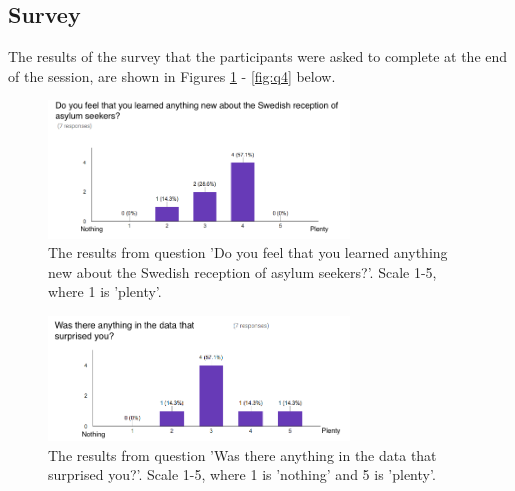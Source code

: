 \documentclass{acmtog} %
\begin{document}
\begin{table}[!ht]
\label{tab:high-level}
\end{table}

\begin{table}[!ht]
\label{tab:low-level}
\end{table}

\subsection{Survey}
\label{sub:results_survey}
The results of the survey that the participants were asked to complete at the end of the session, are shown in Figures \ref{fig:q1} - \ref{fig:q4} below.

\begin{figure}[!ht]
\centering
\includegraphics[width=8cm]{img/q1_en.png}
\caption{The results from question 'Do you feel that you learned anything new about the Swedish reception of asylum seekers?'. Scale 1-5, where 1 is 'plenty'.}
\label{fig:q1}
\end{figure}

\begin{figure}[!ht]
\centering
\includegraphics[width=8cm]{img/q2_en.png}
\caption{The results from question 'Was there anything in the data that surprised you?'. Scale 1-5, where 1 is 'nothing' and 5 is 'plenty'.}
\label{fig:q2}
\end{figure}
\end{document}

